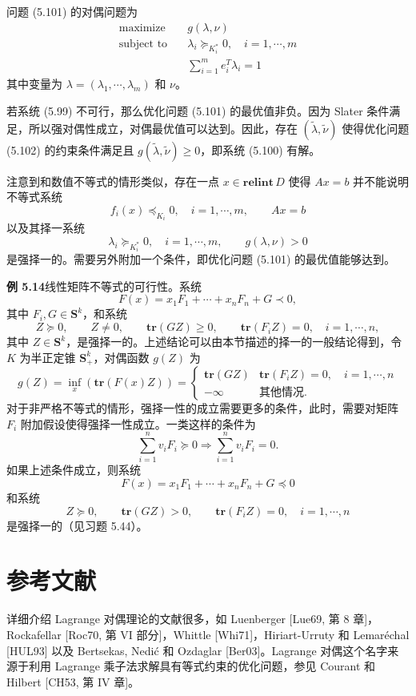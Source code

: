 \documentclass[UTF8,12pt,a4paper,fontset=fandol]{ctexart}
\begin{document}
问题 (5.101) 的对偶问题为
\begin{equation}
\begin{aligned}
\text{maximize}\quad & g(\lambda,\nu)\\
\text{subject to}\quad & \lambda_i\succeq_{K_i^\ast}0,\quad i=1,\cdots,m\\
& \sum_{i=1}^m e_i^T\lambda_i=1
\end{aligned}
\tag{5.102}
\end{equation}
其中变量为 $\lambda=(\lambda_1,\cdots,\lambda_m)$ 和 $\nu$。

若系统 (5.99) 不可行，那么优化问题 (5.101) 的最优值非负。因为 Slater 条件满足，所以强对偶性成立，对偶最优值可以达到。因此，存在 $(\tilde{\lambda},\tilde{\nu})$ 使得优化问题 (5.102) 的约束条件满足且 $g(\tilde{\lambda},\tilde{\nu})\geq 0$，即系统 (5.100) 有解。

注意到和数值不等式的情形类似，存在一点 $x\in\mathbf{relint}\,D$ 使得 $Ax=b$ 并不能说明不等式系统
\[
f_i(x)\preceq_{K_i}0,\quad i=1,\cdots,m,\qquad Ax=b
\]
以及其择一系统
\[
\lambda_i\succeq_{K_i^\ast}0,\quad i=1,\cdots,m,\qquad g(\lambda,\nu)>0
\]
是强择一的。需要另外附加一个条件，即优化问题 (5.101) 的最优值能够达到。

\noindent\textbf{例 5.14}\quad 线性矩阵不等式的可行性。系统
\[
F(x)=x_1F_1+\cdots+x_nF_n+G\prec 0,
\]
其中 $F_i,G\in\mathbf{S}^k$，和系统
\[
Z\succeq 0,\qquad Z\neq 0,\qquad \mathbf{tr}(GZ)\geq 0,\qquad \mathbf{tr}(F_iZ)=0,\quad i=1,\cdots,n,
\]
其中 $Z\in\mathbf{S}^k$，是强择一的。上述结论可以由本节描述的择一的一般结论得到，令 $K$ 为半正定锥 $\mathbf{S}_+^k$，对偶函数 $g(Z)$ 为
\[
g(Z)=\inf_x(\mathbf{tr}(F(x)Z))=
\begin{cases}
\mathbf{tr}(GZ) & \mathbf{tr}(F_iZ)=0,\quad i=1,\cdots,n\\
-\infty & \text{其他情况}.
\end{cases}
\]
对于非严格不等式的情形，强择一性的成立需要更多的条件，此时，需要对矩阵 $F_i$ 附加假设使得强择一性成立。一类这样的条件为
\[
\sum_{i=1}^n v_iF_i\succeq 0\Longrightarrow \sum_{i=1}^n v_iF_i=0.
\]
如果上述条件成立，则系统
\[
F(x)=x_1F_1+\cdots+x_nF_n+G\preceq 0
\]
和系统
\[
Z\succeq 0,\qquad \mathbf{tr}(GZ)>0,\qquad \mathbf{tr}(F_iZ)=0,\quad i=1,\cdots,n
\]
是强择一的（见习题 5.44）。

\section*{参考文献}

详细介绍 Lagrange 对偶理论的文献很多，如 Luenberger [Lue69, 第 8 章]，Rockafellar [Roc70, 第 VI 部分]，Whittle [Whi71]，Hiriart-Urruty 和 Lemaréchal [HUL93] 以及 Bertsekas, Nedić 和 Ozdaglar [Ber03]。Lagrange 对偶这个名字来源于利用 Lagrange 乘子法求解具有等式约束的优化问题，参见 Courant 和 Hilbert [CH53, 第 IV 章]。
\end{document}
